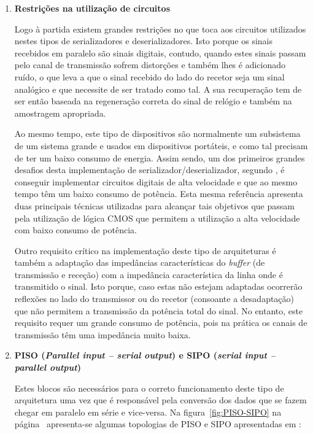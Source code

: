\begin{enumerate}
	\item \textbf{Restrições na utilização de circuitos}
	
	\hspace{1.0em}Logo à partida existem grandes restrições no que toca aos circuitos utilizados nestes tipos de serializadores e deserializadores. Isto porque os sinais recebidos em paralelo são sinais digitais, contudo, quando estes sinais passam pelo canal de transmissão sofrem distorções e também lhes é adicionado ruído, o que leva a que o sinal recebido do lado do recetor seja um sinal analógico e que necessite de ser tratado como tal. A sua recuperação tem de ser então baseada na regeneração correta do sinal de relógio e também na amostragem apropriada. 
	
	\hspace{1.0em}Ao mesmo tempo, este tipo de dispositivos são normalmente um subsistema de um sistema grande e usados em dispositivos portáteis, e como tal precisam de ter um baixo consumo de energia. Assim sendo, um dos primeiros grandes desafios desta implementação de serializador/deserializador, segundo \cite{R012}, é conseguir implementar circuitos digitais de alta velocidade e que ao mesmo tempo têm um baixo consumo de potência. Esta mesma referência apresenta duas principais técnicas utilizadas para alcançar tais objetivos que passam pela utilização de lógica CMOS que permitem a utilização a alta velocidade com baixo consumo de potência. 
	
	\hspace{1.0em}Outro requisito crítico na implementação deste tipo de arquiteturas é também a adaptação das impedâncias características do \textit{buffer} (de transmissão e receção) com a impedância característica da linha onde é transmitido o sinal. Isto porque, caso estas não estejam adaptadas ocorrerão reflexões no lado do transmissor ou do recetor (consoante a desadaptação) que não permitem a transmissão da potência total do sinal. No entanto, este requisito requer um grande consumo de potência, pois na prática os canais de transmissão têm uma impedância muito baixa. 
	
	\item \textbf{PISO (\textit{Parallel input – serial output}) e SIPO (\textit{serial input – parallel output})}
	
	\hspace{1.0em}Estes blocos são necessários para o correto funcionamento deste tipo de arquitetura uma vez que é responsável pela conversão dos dados que se fazem chegar em paralelo em série e vice-versa. Na figura~\ref{fig:PISO-SIPO} na página~\pageref{fig:PISO-SIPO} apresenta-se algumas topologias de PISO e SIPO apresentadas em \cite{R012}:


\end{enumerate}
